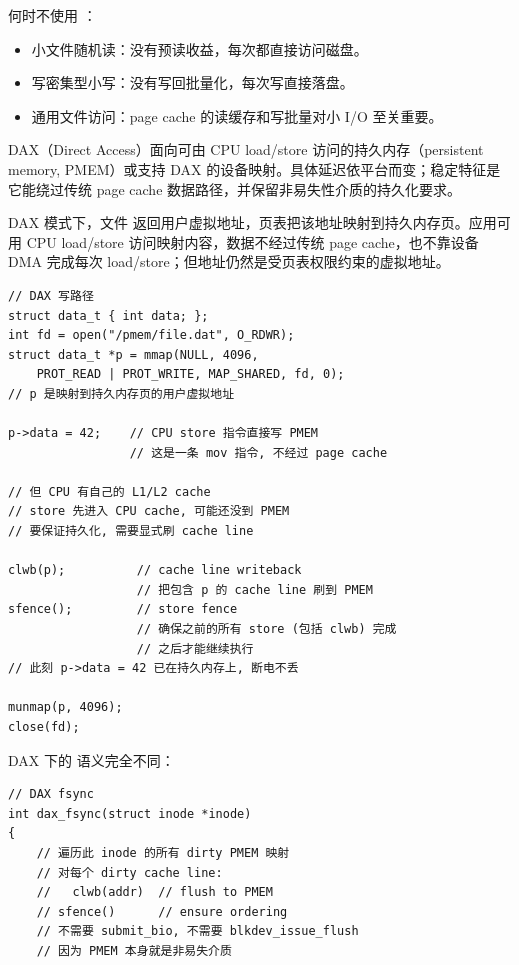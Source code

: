 \begin{filesystemlayout}
何时不使用 ：

\begin{itemize}
\tightlist
\item 小文件随机读：没有预读收益，每次都直接访问磁盘。
\item 写密集型小写：没有写回批量化，每次写直接落盘。
\item 通用文件访问：page cache 的读缓存和写批量对小 I/O 至关重要。
\end{itemize}


DAX（Direct Access）面向可由 CPU load/store 访问的持久内存（persistent memory, PMEM）或支持 DAX 的设备映射。具体延迟依平台而变；稳定特征是它能绕过传统 page cache 数据路径，并保留非易失性介质的持久化要求。

DAX 模式下，文件  返回用户虚拟地址，页表把该地址映射到持久内存页。应用可用 CPU load/store 访问映射内容，数据不经过传统 page cache，也不靠设备 DMA 完成每次 load/store；但地址仍然是受页表权限约束的虚拟地址。

\begin{lstlisting}
// DAX 写路径
struct data_t { int data; };
int fd = open("/pmem/file.dat", O_RDWR);
struct data_t *p = mmap(NULL, 4096,
    PROT_READ | PROT_WRITE, MAP_SHARED, fd, 0);
// p 是映射到持久内存页的用户虚拟地址

p->data = 42;    // CPU store 指令直接写 PMEM
                 // 这是一条 mov 指令, 不经过 page cache

// 但 CPU 有自己的 L1/L2 cache
// store 先进入 CPU cache, 可能还没到 PMEM
// 要保证持久化, 需要显式刷 cache line

clwb(p);          // cache line writeback
                  // 把包含 p 的 cache line 刷到 PMEM
sfence();         // store fence
                  // 确保之前的所有 store (包括 clwb) 完成
                  // 之后才能继续执行
// 此刻 p->data = 42 已在持久内存上, 断电不丢

munmap(p, 4096);
close(fd);
\end{lstlisting}

DAX 下的  语义完全不同：

\begin{lstlisting}
// DAX fsync
int dax_fsync(struct inode *inode)
{
    // 遍历此 inode 的所有 dirty PMEM 映射
    // 对每个 dirty cache line:
    //   clwb(addr)  // flush to PMEM
    // sfence()      // ensure ordering
    // 不需要 submit_bio, 不需要 blkdev_issue_flush
    // 因为 PMEM 本身就是非易失介质


\end{lstlisting}
\end{filesystemlayout}
